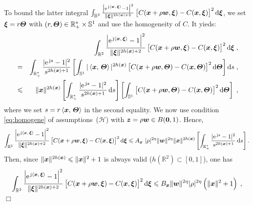 \documentclass{elsarticle}
\newenvironment{proof}{\medskip\noindent{\bf Proof.}\;}{\null\hfill $\Box$\par\medskip }
\begin{document}
\begin{proof}
To bound the latter integral $\int_{\mathbb{R}^2}\frac{\left|\expj{\ip{\vect{x}}{\vect{\xi}}}-1\right|^2}{\lVert \vect{\xi} \rVert^{2h(\vect{x})+2}}\left[C(\vect{x}+\rho \vect{w},\vect{\xi})-C(\vect{x},\vect{\xi})\right]^2\dif\vect{\xi}$, we set $\bm{\xi}=r\bm{\Theta}$ with $(r,\bm{\Theta})\in \mathbb{R}_+^*\times \mathbb{S}^1$ and use the homogeneity of $C$. It yieds:
\begin{eqnarray*}
&&\int_{\mathbb{R}^2}\frac{\left|\expj{\ip{\vect{x}}{\vect{\xi}}}-1\right|^2}{\lVert \vect{\xi} \rVert^{2h(\vect{x})+2}}\left[C(\vect{x}+\rho \vect{w},\vect{\xi})-C(\vect{x},\vect{\xi})\right]^2\dif\vect{\xi}\;,\\
&=&\int_{\mathbb{R}_+^*}\frac{|\expj{s}-1|^2}{{s^{2h(\vect{x})+1}}}\left[\int_{\mathbb{S}^1}|\ip{\vect{x}}{\vect{\Theta}}|^{2h(\vect{x})}\left[C(\vect{x}+\rho \vect{w},\vect{\Theta})-C(\vect{x},\vect{\Theta})\right]^2 \dif\vect{\Theta}\right]\dif s\;,\\
&\leq& \|\vect{x}\|^{2h(\vect{x})}\left[\int_{\mathbb{R}_+^*}\frac{|\expj{s}-1|^2}{{s^{2h(\vect{x})+1}}}\dif s\right]\left[\int_{\mathbb{S}^1}\left[C(\vect{x}+\rho \vect{w},\vect{\Theta})-C(\vect{x},\vect{\Theta})\right]^2 \dif\vect{\Theta}\right]\;,
\end{eqnarray*}
where we set $s=r \left \langle \bm{x},\, \bm{\Theta}\right \rangle$ in the second equality.
We now use condition \eqref{eq:homogene} of assumptions~($\mathcal{H}$) with $\bm{z}=\rho \bm{w}\in B(\bm{0},1)$. Hence,
\[
\int_{\mathbb{R}^2}\frac{\left|\expj{\ip{\vect{x}}{\vect{\xi}}}-1\right|^2}{\lVert \vect{\xi} \rVert^{2h(\vect{x})+2}}\left[C(\vect{x}+\rho \vect{w},\vect{\xi})-C(\vect{x},\vect{\xi})\right]^2\dif\vect{\xi}\leq A_{\vect{x}}~ |\rho|^{2\eta}\|\vect{w}\|^{2\eta}\|\vect{x}\|^{2h(\vect{x})}\left[\int_{\mathbb{R}_+^*}\frac{|\expj{s}-1|^2}{{s^{2h(\vect{x})+1}}}\dif s\right].
\]
Then, since $\|\bm{x}\|^{2h(\bm{x})}\leqslant \|\bm{x}\|^{2}+1$ is always valid ($h(\mathbb{R}^2)\subset [0,1]$), one has
\begin{equation}
\label{eq:CV-J}
\int_{\mathbb{R}^2}\frac{\left|\expj{\ip{\vect{x}}{\vect{\xi}}}-1\right|^2}{\lVert \vect{\xi} \rVert^{2h(\vect{x})+2}}\left[C(\vect{x}+\rho \vect{w},\vect{\xi})-C(\vect{x},\vect{\xi})\right]^2\dif\vect{\xi}\leq  B_{\vect{x}}\|\vect{w}\|^{2\eta} |\rho|^{2\eta}\left(\|\vect{x}\|^2+1\right)\;,

\end{equation}
\end{proof}
\end{document}
